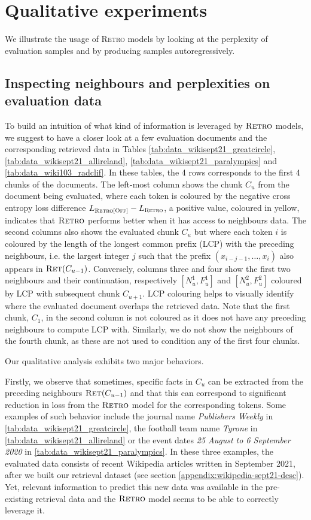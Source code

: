 \documentclass[11pt, a4paper, logo]{deepmind}
\newcommand{\ret}{\textsc{Ret}}
\newcommand{\retro}{\textsc{Retro}\xspace}
\begin{document}
\section{Qualitative experiments}\label{app:qualitative}

We illustrate the usage of \retro models by looking at the perplexity of evaluation samples and by producing samples autoregressively.

\subsection{Inspecting neighbours and perplexities on evaluation data}
To build an intuition of what kind of information is leveraged by $\retro$ models, we suggest to have a closer look at a few evaluation documents and the corresponding retrieved data in Tables \ref{tab:data_wikisept21_greatcircle}, \ref{tab:data_wikisept21_allireland}, \ref{tab:data_wikisept21_paralympics} and \ref{tab:data_wiki103_radclif}. In these tables, the 4 rows corresponds to the first 4 chunks of the documents. The left-most column shows the chunk $C_u$ from the document being evaluated, where each token is coloured by the negative cross entropy loss difference $L_{\retro\textsc{[Off]}} - L_{\retro}$, a positive value, coloured in yellow, indicates that $\retro$ performs better when it has access to neighbours data. The second columns also shows the evaluated chunk $C_u$ but where each token $i$ is coloured by the length of the longest common prefix (LCP) with the preceding neighbours, i.e. the largest integer $j$ such that the prefix $(x_{i-j -1}, \dotsc, x_{i})$ also appears in $\ret(C_{u-1})$. Conversely, columns three and four show the first two neighbours and their continuation, respectively $[N^1_u, F^1_u]$ and $[N^2_u, F^2_u]$ coloured by LCP with subsequent chunk $C_{u+1}$.  LCP colouring helps to visually identify where the evaluated document overlaps the retrieved data. Note that the first chunk, $C_1$, in the second column is not coloured as it does not have any preceding neighbours to compute LCP with. Similarly, we do not show the neighbours of the fourth chunk, as these are not used to condition any of the first four chunks. 

Our qualitative analysis exhibits two major behaviors. 

Firstly, we observe that sometimes, specific facts in $C_u$ can be extracted from the preceding neighbours $\ret(C_{u-1})$ and that this can correspond to significant reduction in loss from the $\retro$ model for the corresponding tokens. Some examples of such behavior include the journal name \emph{Publishers Weekly} in \autoref{tab:data_wikisept21_greatcircle}, the football team name \emph{Tyrone} in \autoref{tab:data_wikisept21_allireland} or the event dates \emph{25 August to 6 September 2020} in \autoref{tab:data_wikisept21_paralympics}. In these three examples, the evaluated data consists of recent Wikipedia articles written in September 2021, after we built our retrieval dataset (see section \autoref{appendix:wikipedia-sept21-desc}). Yet, relevant information to predict this new data was available in the pre-existing retrieval data and the $\retro$ model seems to be able to correctly leverage it. 
\end{document}
